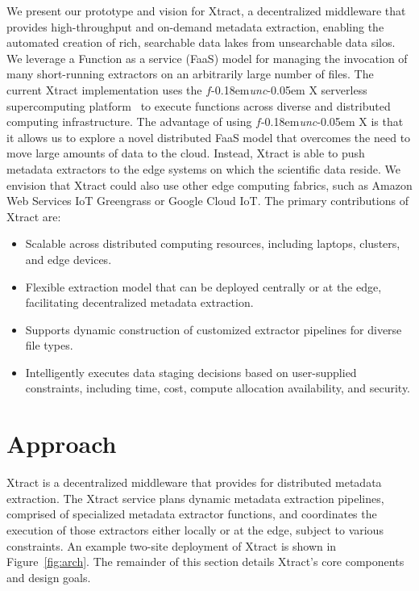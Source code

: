 \documentclass[sigconf, 9pt]{acmart}
\newcommand{\name}{Xtract}
\newcommand{\funcx}{$f$\kern-0.18em\emph{unc}\kern-0.05em X}
\begin{document}
We present our prototype and vision for \name{},
a decentralized middleware that provides high-throughput and on-demand metadata 
extraction, enabling the automated creation of rich, searchable data lakes from unsearchable data silos. 
We leverage a Function as a service (FaaS) model for managing the invocation of
many short-running extractors on an arbitrarily large number of files. 
The current \name{} implementation uses the \funcx{} serverless supercomputing platform~\cite{chard2019serverless}
to execute functions across diverse and distributed computing infrastructure.  
The advantage of using \funcx{} is that it allows us to explore a novel distributed FaaS model 
that overcomes the need to move large amounts of data to the cloud. 
Instead, \name{} is able to push
metadata extractors to the edge systems on which the scientific data reside. 
We envision that \name{} could also use other edge computing fabrics, 
such as Amazon Web Services IoT Greengrass or Google Cloud IoT. 
The primary contributions of \name{} are: 
\begin{itemize}
\item Scalable across distributed computing resources, including laptops, clusters, and edge devices.
\item Flexible extraction model that can be deployed centrally or at the edge, facilitating decentralized metadata extraction.
\item Supports dynamic construction of customized extractor pipelines for diverse file types. 
\item Intelligently executes data staging decisions based on user-supplied constraints, including time, cost, compute allocation availability, and security. 
\end{itemize}


\section{Approach}
\label{sec:approach}

\name{} is a decentralized middleware that provides for distributed metadata extraction. 
The \name{} service plans dynamic metadata extraction pipelines, comprised of specialized
metadata extractor functions, and coordinates the execution of those extractors
either locally or at the edge, subject to various constraints. 
An example two-site deployment of \name{} is shown in Figure~\ref{fig:arch}. 
The remainder of this section 
details \name{}'s core components and design goals.
\end{document}
